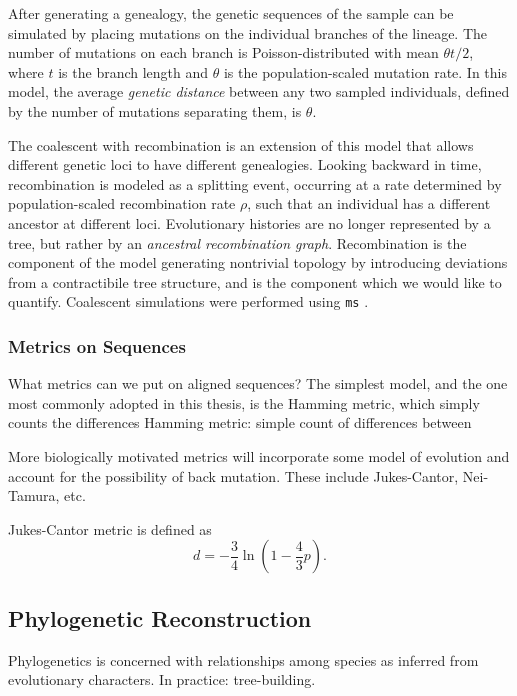 After generating a genealogy, the genetic sequences of the sample can be simulated by placing mutations on the individual branches of the lineage.
The number of mutations on each branch is Poisson-distributed with mean $\theta t / 2$, where $t$ is the branch length and $\theta$ is the population-scaled mutation rate.
In this model, the average \emph{genetic distance} between any two sampled individuals, defined by the number of mutations separating them, is $\theta$.

The coalescent with recombination is an extension of this model that allows different genetic loci to have different genealogies.
Looking backward in time, recombination is modeled as a splitting event, occurring at a rate determined by population-scaled recombination rate $\rho$, such that an individual has a different ancestor at different loci.
Evolutionary histories are no longer represented by a tree, but rather by an \emph{ancestral recombination graph}.
Recombination is the component of the model generating nontrivial topology by introducing deviations from a contractibile tree structure, and is the component which we would like to quantify.
Coalescent simulations were performed using \texttt{ms} \cite{Hudson:2002}.

\subsubsection{Metrics on Sequences}

What metrics can we put on aligned sequences?
The simplest model, and the one most commonly adopted in this thesis, is the Hamming metric, which simply counts the differences 
Hamming metric: simple count of differences between

More biologically motivated metrics will incorporate some model of evolution and account for the possibility of back mutation.
These include Jukes-Cantor, Nei-Tamura, etc.

Jukes-Cantor metric is defined as 
\begin{equation}
d=-\frac{3}{4}\ln(1-\frac{4}{3}p).
\end{equation}

\subsection{Phylogenetic Reconstruction}

Phylogenetics is concerned with relationships among species as inferred from evolutionary characters.
In practice: tree-building.

